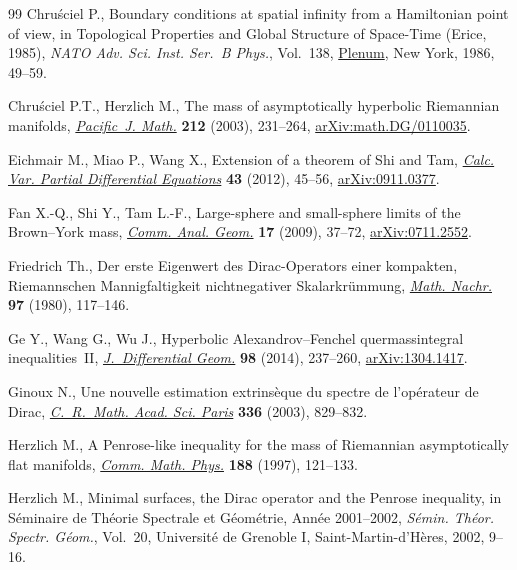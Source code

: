\begin{thebibliography}{99}
Chru\'sciel P., Boundary conditions at spatial infinity from a {H}amiltonian
 point of view, in Topological Properties and Global Structure of Space-Time
 ({E}rice, 1985), \textit{NATO Adv. Sci. Inst. Ser.~B Phys.}, Vol.~138,
 \href{https://doi.org/10.1007/978-1-4899-3626-4_5}{Plenum}, New York, 1986, 49--59.

Chru\'sciel P.T., Herzlich M., The mass of asymptotically hyperbolic
 {R}iemannian manifolds, \href{https://doi.org/10.2140/pjm.2003.212.231}{\textit{Pacific~J. Math.}} \textbf{212} (2003),
 231--264, \href{https://arxiv.org/abs/math.DG/0110035}{arXiv:math.DG/0110035}.

Eichmair M., Miao P., Wang X., Extension of a theorem of {S}hi and {T}am,
 \href{https://doi.org/10.1007/s00526-011-0402-2}{\textit{Calc. Var. Partial Differential Equations}} \textbf{43} (2012),
 45--56, \href{https://arxiv.org/abs/0911.0377}{arXiv:0911.0377}.

Fan X.-Q., Shi Y., Tam L.-F., Large-sphere and small-sphere limits of the
 {B}rown--{Y}ork mass, \href{https://doi.org/10.4310/CAG.2009.v17.n1.a3}{\textit{Comm. Anal. Geom.}} \textbf{17} (2009), 37--72,
 \href{https://arxiv.org/abs/0711.2552}{arXiv:0711.2552}.

Friedrich Th., Der erste {E}igenwert des {D}irac-{O}perators einer kompakten,
 {R}iemannschen {M}annigfaltigkeit nichtnegativer {S}kalarkr\"ummung,
 \href{https://doi.org/10.1002/mana.19800970111}{\textit{Math. Nachr.}} \textbf{97} (1980), 117--146.

Ge Y., Wang G., Wu J., Hyperbolic {A}lexandrov--{F}enchel quermassintegral
 inequalities~{II}, \href{https://doi.org/10.4310/jdg/1406552250}{\textit{J.~Differential Geom.}} \textbf{98} (2014),
 237--260, \href{https://arxiv.org/abs/1304.1417}{arXiv:1304.1417}.

Ginoux N., Une nouvelle estimation extrins\`eque du spectre de l'op\'erateur de
 {D}irac, \href{https://doi.org/10.1016/S1631-073X(03)00206-1}{\textit{C.~R.~Math. Acad. Sci. Paris}} \textbf{336} (2003), 829--832.

Herzlich M., A {P}enrose-like inequality for the mass of {R}iemannian
 asymptotically flat manifolds, \href{https://doi.org/10.1007/s002200050159}{\textit{Comm. Math. Phys.}} \textbf{188}
 (1997), 121--133.

Herzlich M., Minimal surfaces, the {D}irac operator and the {P}enrose
 inequality, in S\'eminaire de {T}h\'eorie {S}pectrale et {G}\'eom\'etrie, {A}nn\'ee 2001--2002, \textit{S\'emin. Th\'eor. Spectr. G\'eom.}, Vol.~20,
 Universit\'e de Grenoble I, Saint-Martin-d'H\`eres, 2002, 9--16.


\end{thebibliography}
